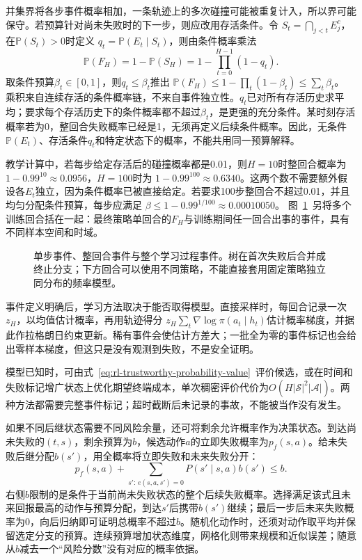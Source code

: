 并集界将各步事件概率相加，一条轨迹上的多次碰撞可能被重复计入，所以界可能保守。若预算针对尚未失败时的下一步，则应改用存活条件。令
$S_t=\bigcap_{j<t}E_j^c$，在$\mathbb P(S_t)>0$时定义
$q_t=\mathbb P(E_t\mid S_t)$，则由条件概率乘法
\[
  \mathbb P(F_H)=1-\mathbb P(S_H)
       =1-\prod_{t=0}^{H-1}(1-q_t).
\]
取条件预算$\beta_t\in[0,1]$，则$q_t\leq\beta_t$推出
$\mathbb P(F_H)\leq1-\prod_t(1-\beta_t)\leq\sum_t\beta_t$。
乘积来自连续存活的条件概率链，不来自事件独立性。$q_t$已对所有存活历史求平均；要求每个存活历史下的条件概率都不超过$\beta_t$，是更强的充分条件。某时刻存活概率若为0，整回合失败概率已经是1，无须再定义后续条件概率。因此，无条件$\mathbb P(E_t)$、存活条件$q_t$和特定状态下的概率，不能共用同一预算解释。

教学计算中，若每步给定存活后的碰撞概率都是0.01，则$H=10$时整回合概率为
$1-0.99^{10}\approx0.0956$，$H=100$时为
$1-0.99^{100}\approx0.6340$。这两个数不需要额外假设各$E_t$独立，因为条件概率已被直接给定。若要求100步整回合不超过0.01，并且均匀分配条件预算，每步应满足
$\beta\leq1-0.99^{1/100}\approx0.00010050$。
图~\ref{fig:rl-trustworthy-events}~另将多个训练回合括在一起：最终策略单回合的$F_H$与训练期间任一回合出事的事件，具有不同样本空间和时域。

\begin{figure}[htbp]
  \centering
  
  \caption{单步事件、整回合事件与整个学习过程事件。树在首次失败后合并成终止分支；下方回合可以使用不同策略，不能直接套用固定策略独立同分布的频率模型。}
  \label{fig:rl-trustworthy-events}
\end{figure}

事件定义明确后，学习方法取决于能否取得模型。直接采样时，每回合记录一次$z_H$，以均值估计概率，再用轨迹得分
$z_H\sum_t\nabla\log\pi(a_t\mid h_t)$估计概率梯度，并据此作拉格朗日约束更新。稀有事件会使估计方差大；一批全为零的事件标记也会给出零样本梯度，但这只是没有观测到失败，不是安全证明。

模型已知时，可由式~\eqref{eq:rl-trustworthy-probability-value}~评价候选，或在时间和失败标记增广状态上优化期望终端成本，单次稠密评价代价为$O(H|\mathcal S|^2|\mathcal A|)$。两种方法都需要完整事件标记；超时截断后未记录的事故，不能被当作没有发生。

如果不同后继状态需要不同风险余量，还可将剩余允许概率作为决策状态。到达尚未失败的$(t,s)$，剩余预算为$b$，候选动作$a$的立即失败概率为$p_f(s,a)$。给未失败后继分配$b(s')$，用全概率将立即失败和未来失败分开：
\begin{equation}
  p_f(s,a)+
    \sum_{s':\,e(s,a,s')=0}P(s'\mid s,a)b(s')\leq b.
  \label{eq:rl-trustworthy-risk-budget}
\end{equation}
右侧$b$限制的是条件于当前尚未失败状态的整个后续失败概率。选择满足该式且未来回报最高的动作与预算分配，到达$s'$后携带$b(s')$继续；最后一步后未来失败概率为0，向后归纳即可证明总概率不超过$b$。随机化动作时，还须对动作取平均并保留选定分支的预算。连续预算增加状态维度，网格化则带来规模和近似误差；随意从$b$减去一个“风险分数”没有对应的概率依据。

